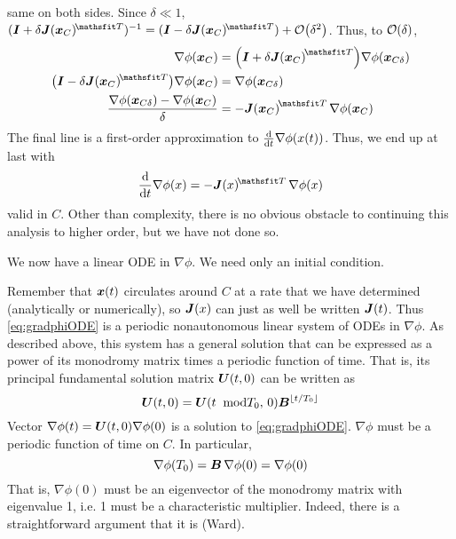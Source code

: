 same on both sides. Since  $\delta\ll1$,  
$(\I+\delta\vb{J}(\vb{x}_{C})^{\T})^{-1}
=(\I-\delta\vb{J}(\vb{x}_{C})^{\T})+\order{\delta^2}$. 
Thus, to $\order{\delta}$,
\begin{equation}
\begin{aligned}
{\nabla}\phi(\vb{x}_{C})&=\qty(\I+\delta\vb{J}{(\vb{x}_{C})}^{\T})
{\nabla}\phi(\vb{x}_{C\delta})\\
\qty(\I-\delta \vb{J}(\vb{x}_{C})^{\T})
{\nabla}\phi(\vb{x}_{C})&={\nabla}\phi(\vb{x}_{C\delta})\\
\frac{{\nabla}\phi(\vb{x}_{C\delta})-{\nabla}\phi(\vb{x}_{C})}{\delta}
&=-\vb{J}{(\vb{x}_{C})}^{\T}\,{\nabla}\phi(\vb{x}_{C})
\end{aligned}
\end{equation}
The final line is a first-order approximation to 
$\dv{t} \nabla\phi(x(t))$. Thus, we end up at last with 
\begin{equation}\label{eq:gradphiODE}
\dv{t} \nabla\phi(x)
=-\vb{J}(x)^{\T}\,\nabla\phi(x)
\end{equation}
valid in  $C$. Other than complexity, there is no obvious obstacle to
continuing this analysis to higher order, but we have not done so. 

We now have a linear ODE in ${\nabla}\phi$. We need only an
initial condition. 

Remember that  $\vb{x}(t)$ circulates around  $C$ at a rate that we have
determined (analytically or numerically), so  $\vb{J}(x)$ can just as well
be written  $\vb{J}(t)$. Thus \eqref{eq:gradphiODE} is a periodic nonautonomous linear
system of ODEs in  ${\nabla}\phi$. As described above, this
system has a general solution that can be expressed as a power of its
monodromy matrix times a periodic function of time. That is, its
principal fundamental solution matrix  $\vb{U}(t,0)$ can be written as 
\begin{equation}
\vb{U}(t,0)=\vb{U}(t\;\;\text{mod}{T}_{0},\,0)\vb{B}^{\lfloor t/{T}_0\rfloor}
\end{equation}
Vector  ${\nabla}\phi(t)=\vb{U}(t, 0){\nabla}\phi(0)$ 
is a solution to \eqref{eq:gradphiODE}. ${\nabla}\phi$ must be a periodic function of
time on $C$. In particular, 
\begin{equation}
\nabla\phi(T_0)=\vb{B}\,\nabla\phi(0)={\nabla}\phi(0)
\end{equation}
That is,  ${\nabla}\phi(0)$ must be an eigenvector of
the monodromy matrix with eigenvalue 1, i.e. 1 must be a
characteristic multiplier. Indeed, there is a straightforward
argument that it is (Ward). 





